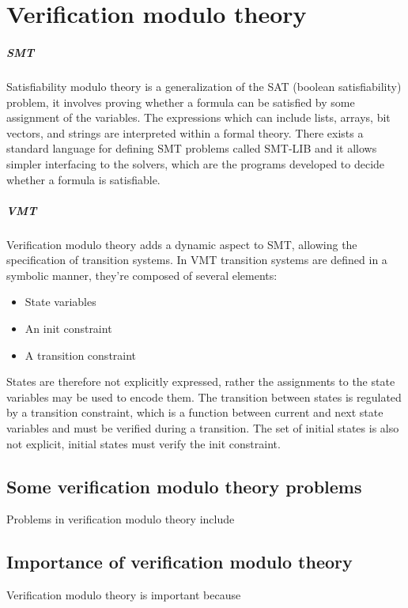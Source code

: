 \chapter{Verification modulo theory}

\paragraph*{SMT}
Satisfiability modulo theory is a generalization of the SAT (boolean satisfiability) problem, it involves proving whether a formula can be satisfied by some assignment of the variables. The expressions which can include lists, arrays, bit vectors, and strings are interpreted within a formal theory. There exists a standard language for defining SMT problems called SMT-LIB \cite{SMT-LIB} and it allows simpler interfacing to the solvers, which are the programs developed to decide whether a formula is satisfiable.

\paragraph*{VMT}
Verification modulo theory adds a dynamic aspect to SMT, allowing the specification of transition systems. In VMT transition systems are defined in a symbolic manner, they're composed of several elements:
\begin{itemize}
    \item State variables
    \item An init constraint
    \item A transition constraint
\end{itemize}
States are therefore not explicitly expressed, rather the assignments to the state variables may be used to encode them. The transition between states is regulated by a transition constraint, which is a function between current and next state variables and must be verified during a transition. The set of initial states is also not explicit, initial states must verify the init constraint.


\section{Some verification modulo theory problems}
Problems in verification modulo theory include %

\section{Importance of verification modulo theory}
Verification modulo theory is important because %

